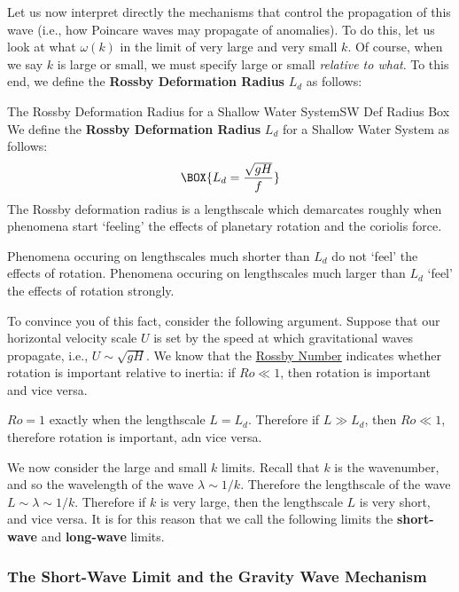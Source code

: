 Let us now interpret directly the mechanisms that control the propagation of this wave (i.e., how Poincare waves may propagate of anomalies). To do this, let us look at what $\omega(k)$ in the limit of very large and very small $k$. Of course, when we say $k$ is large or small, we must specify large or small \textit{relative to what}. To this end, we define the \textbf{Rossby Deformation Radius} $L_d$ as follows:
\begin{fact}{The Rossby Deformation Radius for a Shallow Water System}{SW Def Radius Box}\label{SW Def Radius Box}
    We define the \textbf{Rossby Deformation Radius} $L_d$ for a Shallow Water System as follows:
    \begin{gather}
        \BOX{L_d = \frac{\sqrt{gH}}{f}}
    \end{gather}
    The Rossby deformation radius is a lengthscale which demarcates roughly when phenomena start `feeling' the effects of planetary rotation and the coriolis force. 

    Phenomena occuring on lengthscales much shorter than $L_d$ do not `feel' the effects of rotation. Phenomena occuring on lengthscales much larger than $L_d$ `feel' the effects of rotation strongly.
\end{fact}

To convince you of this fact, consider the following argument. Suppose that our horizontal velocity scale $U$ is set by the speed at which gravitational waves propagate, i.e., $U\sim\sqrt{gH}$. We know that the \hyperref[Rossby Box]{Rossby Number} indicates whether rotation is important relative to inertia: if $Ro\ll 1$, then rotation is important and vice versa.

$Ro=1$ exactly when the lengthscale $L=L_d$. Therefore if $L\gg L_d$, then $Ro\ll1$, therefore rotation is important, adn vice versa.

We now consider the large and small $k$ limits. Recall that $k$ is the wavenumber, and so the wavelength of the wave $\lambda\sim 1/k$. Therefore the lengthscale of the wave $L\sim\lambda\sim 1/k$. Therefore if $k$ is very large, then the lengthscale $L$ is very short, and vice versa. It is for this reason that we call the following limits the \textbf{short-wave} and \textbf{long-wave} limits.

\subsubsection{The Short-Wave Limit and the Gravity Wave Mechanism}

